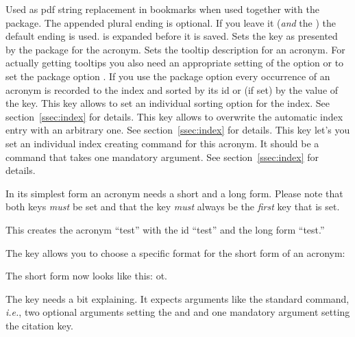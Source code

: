 \documentclass[load-preamble+]{cnltx-doc}
\newcommand*\latin{\textit}
\begin{document}
\begin{options}
    Used as \acs{pdf} string replacement in bookmarks
    when used together with the  package.  The appended plural
    ending is optional.  If you leave it (\emph{and} the \code{/}) the default
    ending is used.   is expanded before it is saved.
    Sets the  key as presented by the  package
    for the acronym.
    Sets the tooltip description for an acronym.  For
    actually getting tooltips you also need an appropriate setting of the
     option or to set the package option
    .
    If you use the package option  every occurrence of an
    acronym is recorded to the index and sorted by its \acs{id} or (if set) by
    the value of the  key.  This key allows to set an individual
    sorting option for the index.  See section~\vref{ssec:index} for details.
    This key allows to overwrite the automatic index entry with an arbitrary
    one.  See section~\vref{ssec:index} for details.
    This key let's you set an individual index creating command for this
    acronym.  It should be a command that takes one mandatory argument.  See
    section~\vref{ssec:index} for details. 
\end{options}

In its simplest form an acronym needs a short and a long form.  Please note
that both keys \emph{must} be set and that the  key \emph{must}
always be the \emph{first} key that is set.
\begin{sourcecode}
\end{sourcecode}
This creates the acronym ``\acs{test}'' with the \acs{id} ``test'' and the
long form ``\acl{test}.''

The  key allows you to choose a specific format for the short
form of an acronym:
\begin{sourcecode}
\end{sourcecode}
The short form now looks like this: \acs{ot}.

The  key needs a bit explaining.  It expects arguments like the
standard  command, \latin{i.e.}, two optional arguments setting the
 and  and one mandatory argument setting the
citation key.
\begin{sourcecode}
\end{sourcecode}
\end{document}
